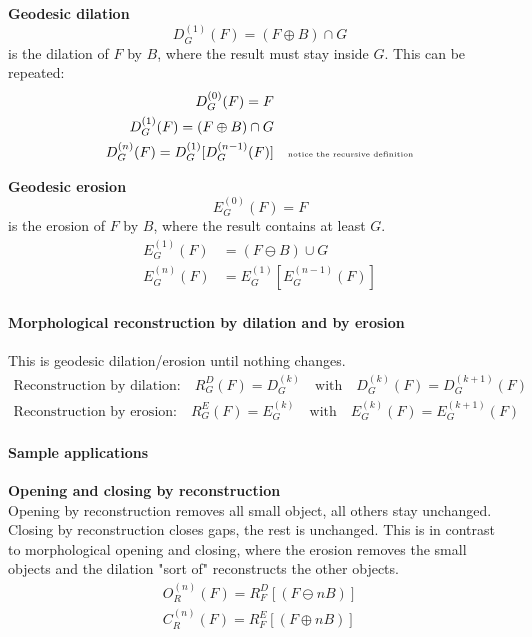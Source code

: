 \textbf{Geodesic dilation}
\[
	D_G^{(1)}(F) = (F\oplus B)\cap G
\]
is the dilation of $F$ by $B$, where the result must stay inside $G$.
This can be repeated:
\begin{align*}
	D_G^{(0)}(F) = F \\
	D_G^{(1)}(F) = (F\oplus B)\cap G\\
	D_G^{(n)}(F) = D_G^{(1)}[D_G^{(n-1)}(F)]	&& \text{\tiny notice the recursive definition}
\end{align*}

\textbf{Geodesic erosion}
	\[
		E_G^{(0)}(F) = F
	\]
is the erosion of $F$ by $B$, where the result contains at least $G$.
\begin{align*}
	E_G^{(1)}(F) &= (F\ominus B)\cup G \\
	E_G^{(n)}(F) &= E_G^{(1)}[E_G^{(n-1)}(F)]
\end{align*}

\paragraph{Morphological reconstruction by dilation and by erosion}
This is geodesic dilation/erosion until nothing changes.
\begin{align*}
    \text{Reconstruction by dilation:} \quad R_G^D(F)=D_G^{(k)} \quad \text{with} \quad D_G^{(k)}(F)=D_G^{(k+1)}(F)\\
    \text{Reconstruction by erosion:} \quad R_G^E(F)=E_G^{(k)} \quad \text{with} \quad E_G^{(k)}(F)=E_G^{(k+1)}(F)
\end{align*}

\paragraph{Sample applications}
\textbf{Opening and closing by reconstruction}\\
Opening by reconstruction removes all small object, all others stay unchanged.
Closing by reconstruction closes gaps, the rest is unchanged. This is in contrast to morphological opening and closing, where the erosion removes the small objects and the dilation "sort of" reconstructs the other objects.\\
\begin{align*}
O_R^{(n)}(F)=R_F^D[(F\ominus nB)]\\
C_R^{(n)}(F)=R_F^E[(F\oplus nB)]
\end{align*}

